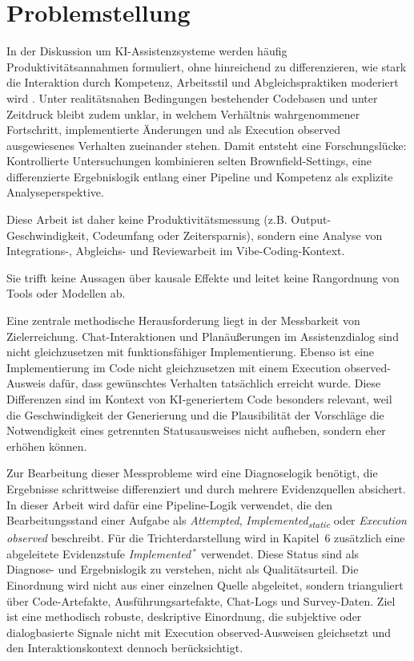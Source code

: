 \section{Problemstellung}
In der Diskussion um KI-Assistenzsysteme werden häufig Produktivitätsannahmen formuliert, ohne hinreichend zu differenzieren, wie stark die Interaktion durch Kompetenz, Arbeitsstil und Abgleichspraktiken moderiert wird \parencite{peng2023copilot}.
Unter realitätsnahen Bedingungen bestehender Codebasen und unter Zeitdruck bleibt zudem unklar, in welchem Verhältnis wahrgenommener Fortschritt, implementierte Änderungen und als Execution observed ausgewiesenes Verhalten zueinander stehen.
Damit entsteht eine Forschungslücke: Kontrollierte Untersuchungen kombinieren selten Brownfield-Settings, eine differenzierte Ergebnislogik entlang einer Pipeline und Kompetenz als explizite Analyseperspektive.

Diese Arbeit ist daher keine Produktivitätsmessung (z.B. Output-Geschwindigkeit, Codeumfang oder Zeitersparnis), sondern eine Analyse von Integrations-, Abgleichs- und Reviewarbeit im Vibe-Coding-Kontext.

Sie trifft keine Aussagen über kausale Effekte und leitet keine Rangordnung von Tools oder Modellen ab.

Eine zentrale methodische Herausforderung liegt in der Messbarkeit von Zielerreichung.
Chat-Interaktionen und Planäußerungen im Assistenzdialog sind nicht gleichzusetzen mit funktionsfähiger Implementierung.
Ebenso ist eine Implementierung im Code nicht gleichzusetzen mit einem Execution observed-Ausweis dafür, dass gewünschtes Verhalten tatsächlich erreicht wurde.
Diese Differenzen sind im Kontext von KI-generiertem Code besonders relevant, weil die Geschwindigkeit der Generierung und die Plausibilität der Vorschläge die Notwendigkeit eines getrennten Statusausweises nicht aufheben, sondern eher erhöhen können.

Zur Bearbeitung dieser Messprobleme wird eine Diagnoselogik benötigt, die Ergebnisse schrittweise differenziert und durch mehrere Evidenzquellen absichert.
In dieser Arbeit wird dafür eine Pipeline-Logik verwendet, die den Bearbeitungsstand einer Aufgabe als \textit{Attempted}, \textit{Implemented\textsubscript{static}} oder \textit{Execution observed} beschreibt.
Für die Trichterdarstellung wird in Kapitel~6 zusätzlich eine abgeleitete Evidenzstufe  \textit{Implemented}\,$^\ast$ verwendet.
Diese Status sind als Diagnose- und Ergebnislogik zu verstehen, nicht als Qualitätsurteil.
Die Einordnung wird nicht aus einer einzelnen Quelle abgeleitet, sondern trianguliert über Code-Artefakte, Ausführungsartefakte, Chat-Logs und Survey-Daten.
Ziel ist eine methodisch robuste, deskriptive Einordnung, die subjektive oder dialogbasierte Signale nicht mit Execution observed-Ausweisen gleichsetzt und den Interaktionskontext dennoch berücksichtigt.

